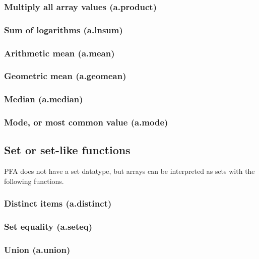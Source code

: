 \documentclass{article}
\theoremstyle{definition}
\begin{document}
\subsubsection{Multiply all array values (a.product)}

\subsubsection{Sum of logarithms (a.lnsum)}

\subsubsection{Arithmetic mean (a.mean)}

\subsubsection{Geometric mean (a.geomean)}

\subsubsection{Median (a.median)}

\subsubsection{Mode, or most common value (a.mode)}

\subsection{Set or set-like functions}

PFA does not have a set datatype, but arrays can be interpreted as sets with the following functions.

\subsubsection{Distinct items (a.distinct)}

\subsubsection{Set equality (a.seteq)}

\subsubsection{Union (a.union)}
\end{document}
